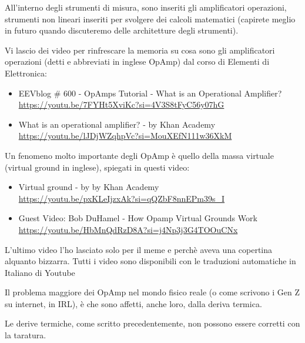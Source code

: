 All'interno degli strumenti di misura, sono inseriti gli amplificatori operazioni, 
strumenti non lineari inseriti per svolgere dei calcoli matematici (capirete meglio in futuro quando discuteremo delle architetture degli strumenti). \newline 

\begin{tcolorbox}

    Vi lascio dei video per rinfrescare la memoria su cosa sono gli amplificatori operazioni (detti e abbreviati in inglese OpAmp) dal corso di Elementi di Elettronica: 
    \begin{itemize}
        \item EEVblog \# 600 - OpAmps Tutorial - What is an Operational Amplifier?\\ \url{https://youtu.be/7FYHt5XviKc?si=4V3S8tFyC56y07hG} 
        \item What is an operational amplifier? - by Khan  Academy\\ \url{https://youtu.be/lJDjWZqhpVc?si=MouXEfN111w36XkM} 
    \end{itemize}

    Un fenomeno molto importante degli OpAmp è quello della massa virtuale (virtual ground in inglese), spiegati in questi video: 
    \begin{itemize}
        \item Virtual ground - by  by Khan  Academy\\ \url{https://youtu.be/pxKLeIjzxAk?si=qQZbF8nnEPm39s_I} 
        \item Guest Video: Bob DuHamel - How Opamp Virtual Grounds Work\\ \url{https://youtu.be/HbMnQdRzD8A?si=j4Np3j3G4TOOuCNx} 
    \end{itemize}

    L'ultimo video l'ho lasciato solo per il meme e perchè aveva una copertina alquanto bizzarra. \newline 
    Tutti i video sono disponibili con le traduzioni automatiche in Italiano di Youtube
\end{tcolorbox}

Il problema maggiore dei OpAmp nel mondo fisico reale (o come scrivono i Gen Z su internet, in IRL), è che sono affetti, anche loro, dalla deriva termica. \newline 

Le derive termiche, come scritto precedentemente, non possono essere corretti con la taratura. \newline 

